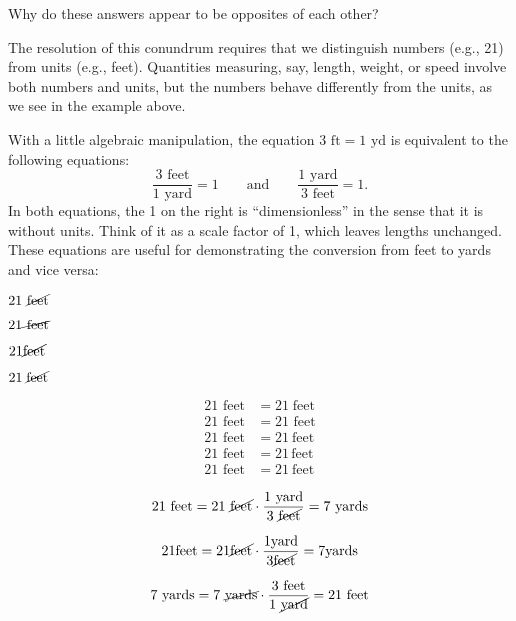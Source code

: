 \documentclass[nooutcomes]{ximera}
\begin{document}
Why do these answers appear to be opposites of each other?  

The resolution of this conundrum requires that we distinguish numbers (e.g., 21) from units (e.g., feet).  Quantities measuring, say, length, weight, or speed involve both numbers and units, but the numbers behave differently from the units, as we see in the example above.  

With a little algebraic manipulation, the equation $3\textrm{ ft} = 1 \textrm{ yd}$ is equivalent to the following equations:  
\[
\frac{3\textrm{ feet}}{1 \textrm{ yard}} = 1\qquad \textrm{and}\qquad \frac{1 \textrm{ yard}}{3\textrm{ feet}} = 1.
\]
In both equations, the 1 on the right is ``dimensionless'' in the sense that it is without units.  Think of it as a scale factor of 1, which leaves lengths unchanged.  These equations are useful for demonstrating the conversion from feet to yards and vice versa:  

%

$21\textrm{ \cancel{feet}}$

$21 \cancel{\textrm{ feet}}$

$21\cancel{\textrm{feet}}$

$21\;\cancel{\textrm{feet}}$



\begin{align*}
21\textrm{ feet} &= 21\; \textrm{feet} \\
21\textrm{ feet} &= 21\textrm{ feet} \\
21\textrm{ feet} &= 21\ \textrm{feet} \\
21\textrm{ feet} &= 21\, \textrm{feet} \\
21\textrm{ feet} &= 21\: \textrm{feet} 
\end{align*}

\[
21\ \textrm{feet} = 21\ \cancel{\textrm{feet}} \cdot \frac{{1\ \textrm{yard}}}{3\ \cancel{\textrm{feet}}} = 7\ \textrm{yards}
\]

\[
21 \textrm{feet} = 21 \cancel{\textrm{feet}} \cdot \frac{{1 \textrm{yard}}}{3 \cancel{\textrm{feet}}} = 7 \textrm{yards}
\]


\[
7\textrm{ yards} = 7\textrm{ \cancel{yards}} \cdot \frac{{3 \textrm{ feet}}}{1\textrm{ \cancel{yard}}} = 
21\textrm{ feet}
\]
\end{document}

